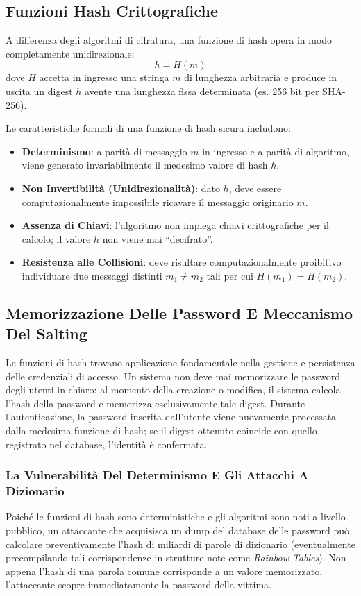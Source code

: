 \documentclass[11pt, a4paper]{article}
\begin{document}
\subsection{Funzioni Hash Crittografiche}

A differenza degli algoritmi di cifratura, una funzione di hash opera in modo completamente unidirezionale:
\begin{equation}
h = H(m)
\end{equation}
dove $H$ accetta in ingresso una stringa $m$ di lunghezza arbitraria e produce in uscita un digest $h$ avente una lunghezza fissa determinata (es. 256 bit per SHA-256).

Le caratteristiche formali di una funzione di hash sicura includono:
\begin{itemize}[leftmargin=*]
    \item \textbf{Determinismo}: a parità di messaggio $m$ in ingresso e a parità di algoritmo, viene generato invariabilmente il medesimo valore di hash $h$.
    \item \textbf{Non Invertibilità (Unidirezionalità)}: dato $h$, deve essere computazionalmente impossibile ricavare il messaggio originario $m$.
    \item \textbf{Assenza di Chiavi}: l'algoritmo non impiega chiavi crittografiche per il calcolo; il valore $h$ non viene mai ``decifrato''.
    \item \textbf{Resistenza alle Collisioni}: deve risultare computazionalmente proibitivo individuare due messaggi distinti $m_1 \neq m_2$ tali per cui $H(m_1) = H(m_2)$.
\end{itemize}

\subsection{Memorizzazione Delle Password E Meccanismo Del Salting}

Le funzioni di hash trovano applicazione fondamentale nella gestione e persistenza delle credenziali di accesso. Un sistema non deve mai memorizzare le password degli utenti in chiaro: al momento della creazione o modifica, il sistema calcola l'hash della password e memorizza esclusivamente tale digest. Durante l'autenticazione, la password inserita dall'utente viene nuovamente processata dalla medesima funzione di hash; se il digest ottenuto coincide con quello registrato nel database, l'identità è confermata.

\subsubsection{La Vulnerabilità Del Determinismo E Gli Attacchi A Dizionario}
Poiché le funzioni di hash sono deterministiche e gli algoritmi sono noti a livello pubblico, un attaccante che acquisisca un dump del database delle password può calcolare preventivamente l'hash di miliardi di parole di dizionario (eventualmente precompilando tali corrispondenze in strutture note come \emph{Rainbow Tables}). Non appena l'hash di una parola comune corrisponde a un valore memorizzato, l'attaccante scopre immediatamente la password della vittima.
\end{document}

